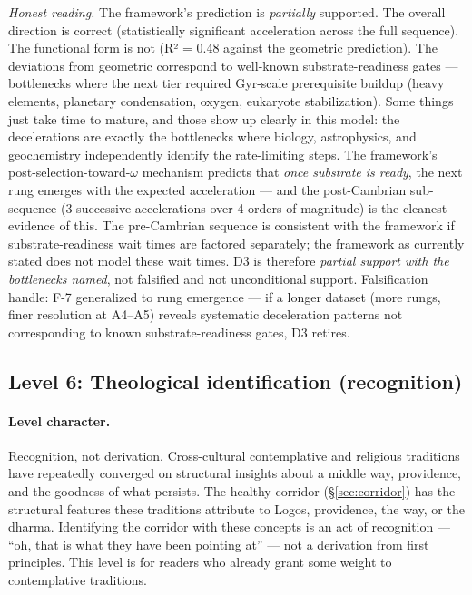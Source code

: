 \documentclass[11pt,a4paper]{article}
\begin{document}
\emph{Honest reading.} The framework's prediction is \emph{partially} supported. The overall direction is correct (statistically significant acceleration across the full sequence). The functional form is not (R² = 0.48 against the geometric prediction). The deviations from geometric correspond to well-known substrate-readiness gates --- bottlenecks where the next tier required Gyr-scale prerequisite buildup (heavy elements, planetary condensation, oxygen, eukaryote stabilization). Some things just take time to mature, and those show up clearly in this model: the decelerations are exactly the bottlenecks where biology, astrophysics, and geochemistry independently identify the rate-limiting steps. The framework's post-selection-toward-$\omega$ mechanism predicts that \emph{once substrate is ready}, the next rung emerges with the expected acceleration --- and the post-Cambrian sub-sequence (3 successive accelerations over 4 orders of magnitude) is the cleanest evidence of this. The pre-Cambrian sequence is consistent with the framework if substrate-readiness wait times are factored separately; the framework as currently stated does not model these wait times. D3 is therefore \emph{partial support with the bottlenecks named}, not falsified and not unconditional support. Falsification handle: F-7 generalized to rung emergence — if a longer dataset (more rungs, finer resolution at A4--A5) reveals systematic deceleration patterns not corresponding to known substrate-readiness gates, D3 retires.

\subsection{Level 6: Theological identification (recognition)}
\label{sec:conjecture-recognition}

\paragraph{Level character.} Recognition, not derivation. Cross-cultural contemplative and religious traditions have repeatedly converged on structural insights about a middle way, providence, and the goodness-of-what-persists. The healthy corridor (\S\ref{sec:corridor}) has the structural features these traditions attribute to Logos, providence, the way, or the dharma. Identifying the corridor with these concepts is an act of recognition --- ``oh, that is what they have been pointing at'' --- not a derivation from first principles. This level is for readers who already grant some weight to contemplative traditions.
\end{document}
